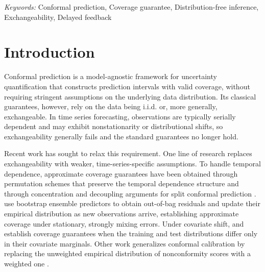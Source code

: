 \documentclass[
  american,
  12pt]{article}
\theoremstyle{plain}
\theoremstyle{plain}
\theoremstyle{remark}
\begin{document}
\noindent%
{\it Keywords:} Conformal prediction, Coverage
guarantee, Distribution-free inference, Exchangeability, Delayed
feedback
\vfill

\newpage
{} %

\renewcommand{\theproposition}{\arabic{proposition}} %
\setcounter{proposition}{0}

\renewcommand{\thecorollary}{\arabic{corollary}} %
\setcounter{corollary}{0}

\section{Introduction}\label{sec-intro}

Conformal prediction \citep{papadopoulos2002, vovk2005} is a
model-agnostic framework for uncertainty quantification that constructs
prediction intervals with valid coverage, without requiring stringent
assumptions on the underlying data distribution. Its classical
guarantees, however, rely on the data being i.i.d. or, more generally,
exchangeable. In time series forecasting, observations are typically
serially dependent and may exhibit nonstationarity or distributional
shifts, so exchangeability generally fails and the standard guarantees
no longer hold.

Recent work has sought to relax this requirement. One line of research
replaces exchangeability with weaker, time-series-specific assumptions.
To handle temporal dependence, approximate coverage guarantees have been
obtained through permutation schemes that preserve the temporal
dependence structure \citep{chernozhukov2018, yu2022} and through
concentration and decoupling arguments for split conformal prediction
\citep{oliveira2024}. \citet{xu2021} use bootstrap ensemble predictors
to obtain out-of-bag residuals and update their empirical distribution
as new observations arrive, establishing approximate coverage under
stationary, strongly mixing errors. Under covariate shift,
\citet{tibshirani2019} and \citet{yang2024} establish coverage
guarantees when the training and test distributions differ only in their
covariate marginals. Other work generalizes conformal calibration by
replacing the unweighted empirical distribution of nonconformity scores
with a weighted one \citep{barber2023, guan2023}.
\end{document}
